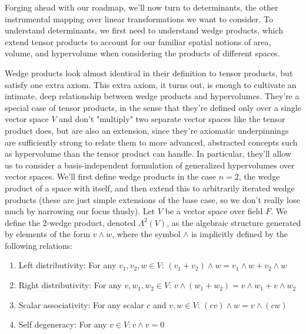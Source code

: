\documentclass{article}
\newcommand{\n}{\leavevmode \newline}
\newcommand{\nn}{\leavevmode \newline \newline}
\begin{document}
Forging ahead with our roadmap, we'll now turn to determinants, the other instrumental mapping over linear transformations we want to consider. To understand determinants, we first need to understand wedge products, which extend tensor products to account for our familiar spatial notions of area, volume, and hypervolume when considering the products of different spaces.
\n
\begin{adjustwidth}{1cm}{1cm}

    Wedge products look almost identical in their definition to tensor products, but satisfy one extra axiom. This extra axiom, it turns out, is enough to cultivate an intimate, deep relationship between wedge products and hypervolumes. They're a special case of tensor products, in the sense that they're defined only over a single vector space $ V $ and don't "multiply" two separate vector spaces like the tensor product does, but are also an extension, since they're axiomatic underpinnings are sufficiently strong to relate them to more advanced, abstracted concepts such as hypervolume than the tensor product can handle. In particular, they'll allow us to consider a basis-independent formulation of generalized hypervolumes over vector spaces. We'll first define wedge products in the case $ n = 2 $, the wedge product of a space with itself, and then extend this to arbitrarily iterated wedge products (these are just simple extensions of the base case, so we don't really lose much by narrowing our focus thusly).
    \nn
    Let $ V $ be a vector space over field $ F $. We define the 2-wedge product, denoted $ \Lambda^2(V) $, as the algebraic structure generated by elements of the form $ v \wedge w $, where the symbol $ \wedge $ is implicitly defined by the following relations:

   	\begin{enumerate}
		\item Left distributivity: For any $ v_1, v_2, w \in V $: $ (v_1 + v_2) \wedge w = v_1 \wedge w + v_2 \wedge w $
		\item Right distributivity: For any $ v, w_1, w_2 \in V $: $ v \wedge (w_1 + w_2) = v \wedge w_1 + v \wedge w_2 $
		\item Scalar associativity: For any scalar $ c $ and $ v, w \in V $: $ (c v) \wedge w = v \wedge (c w) $
	    \item Self degeneracy: For any $ v \in V: v \wedge v = 0 $
	\end{enumerate}


\end{adjustwidth}
\end{document}
